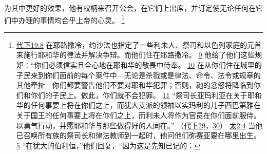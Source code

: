 \documentclass[12pt, a4paper, oneside]{ctexart}
\begin{document}
	为其中更好的效果，他有权柄来召开公会，在它们上出席，并订定使无论任何在它们中办理的事情均合乎上帝的心灵。
	\footnote {
		\href{https://biblehub.com/2_chronicles/19-8.htm}{代下19:8} 在耶路撒冷，约沙法也指定了一些利未人、祭司和以色列家庭的元首来施行耶和华的律法并解决争辩。而他们住在耶路撒冷。
		\href{https://biblehub.com/2_chronicles/19-9.htm}{9} 他给了他们这些规矩：“你们必须信实且全心地在耶和华的敬畏中侍奉。
		\href{https://biblehub.com/2_chronicles/19-10.htm}{10} 在从你们住在城里的子民来到你们面前的每个案件中---无论是杀戮或是律法、命令、法令或规章的其他牵扯---你们都要警告他们不要对耶和华犯罪；否则，祂的忿怒将降临到你们和你们的子民上。做此，你们就不会犯罪。
		\href{https://biblehub.com/2_chronicles/19-11.htm}{11} “祭司长亚玛利亚在关于耶和华的任何事要上将在你们之上，而犹大支派的领袖以实玛利的儿子西巴第雅在关于国王的任何事要上将在你们之上，而利未人将作为官员在你们面前服侍。以勇气行动，并愿耶和华与那些做得好的人同在。”
		（\href{https://biblehub.com/niv/2_chronicles/29.htm}{代下29}，\href{https://biblehub.com/niv/2_chronicles/30.htm}{30}） 
		\href{https://biblehub.com/matthew/2-4.htm}{太2:4} 当他已召唤所有族的祭司长和律法教师到一起时，他问他们弥赛亚要在哪里出生。
		\href{https://biblehub.com/matthew/2-5.htm}{5} “在犹大的伯利恒，”他们回复，“因为这是先知已记的：
	}
\end{document}
